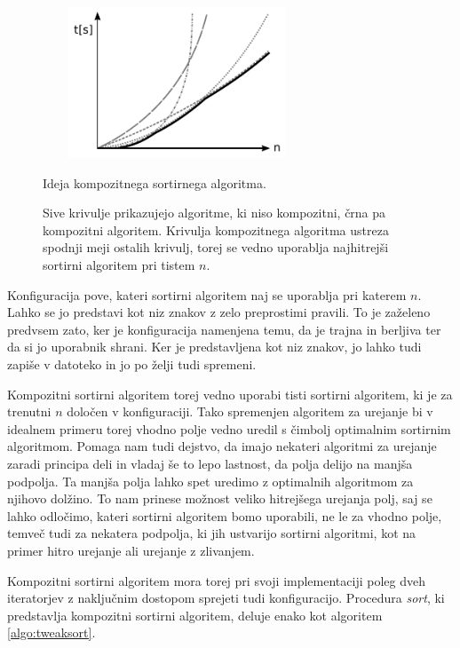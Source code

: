 \documentclass[a4paper,oneside,12pt]{article}
\begin{document}
\begin{figure}[ht]
    \begin{center}
        \includegraphics[width=80mm,height=45mm]{slike/tweaksortidea.pdf}
    \end{center}
    \vspace{-0.7cm}
    \caption[Ideja kompozitnega sortirnega algoritma]{Ideja kompozitnega sortirnega algoritma.}
    \caption*{{\small Sive krivulje prikazujejo algoritme, ki niso kompozitni, črna pa kompozitni algoritem.
    Krivulja kompozitnega algoritma ustreza spodnji meji ostalih krivulj, torej se vedno uporablja 
    najhitrejši sortirni algoritem pri tistem $n$.}}
    \label{fig:tweaksortidea}
\end{figure}

Konfiguracija pove, kateri sortirni algoritem naj se uporablja pri
katerem $n$. Lahko se jo predstavi kot niz znakov z zelo preprostimi
pravili. To je zaželeno predvsem zato, ker je konfiguracija namenjena temu, da je trajna
in berljiva ter da si jo uporabnik shrani. Ker je predstavljena kot niz
znakov, jo lahko tudi zapiše v datoteko in jo po želji tudi spremeni.

Kompozitni sortirni algoritem torej vedno uporabi tisti sortirni algoritem, ki je za  
trenutni $n$ določen v konfiguraciji. Tako spremenjen algoritem za urejanje bi v idealnem
primeru torej vhodno polje vedno uredil s čimbolj optimalnim sortirnim algoritmom.
Pomaga nam tudi dejstvo, da imajo nekateri algoritmi za urejanje zaradi principa deli in vladaj
še to lepo lastnost, da polja delijo na manjša podpolja. Ta manjša polja lahko spet
uredimo z optimalnih algoritmom za njihovo dolžino. To nam prinese možnost veliko hitrejšega
urejanja polj, saj se lahko odločimo, kateri sortirni algoritem bomo
uporabili, ne le za vhodno polje, temveč tudi za nekatera podpolja, ki jih ustvarijo
sortirni algoritmi, kot na primer hitro urejanje ali urejanje z zlivanjem.

Kompozitni sortirni algoritem mora torej pri svoji implementaciji poleg dveh 
iteratorjev z naključnim dostopom sprejeti tudi konfiguracijo. Procedura \emph{sort},
ki predstavlja kompozitni sortirni algoritem, deluje enako kot algoritem
\ref{algo:tweaksort}. 
\end{document}
